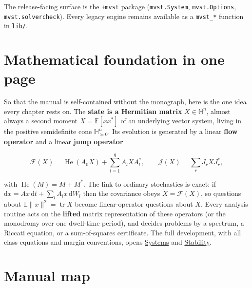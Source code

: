 \documentclass[11pt,oneside]{report}
\newcommand{\code}[1]{\texttt{#1}}
\begin{document}
The release-facing surface is the \code{+mvst} package (\code{mvst.System},
\code{mvst.Options}, \code{mvst.solvercheck}). Every legacy engine remains available as a
\code{mvst\_*} function in \code{lib/}.

\hypertarget{mathematical-foundation-in-one-page}{%
\section*{Mathematical foundation in one page}\label{mathematical-foundation-in-one-page}}

So that the manual is self-contained without the monograph, here is the one idea
every chapter rests on. The \textbf{state is a Hermitian matrix} \(X\in\mathbb{H}^{n}\),
almost always a second moment \(X=\mathbb{E}[x x^{*}]\) of an underlying vector
system, living in the positive semidefinite cone
\(\mathbb{H}^{n}_{\succeq0}\). Its evolution is generated by a linear \textbf{flow
operator} and a linear \textbf{jump operator}

\[\mathcal{F}(X)=\operatorname{He}(A_0X)+\sum_{l=1}^{q}A_l X A_l^{*},\qquad \mathcal{J}(X)=\sum_{r}J_r X J_r^{*},\]

with \(\operatorname{He}(M)=M+M^{*}\). The link to ordinary stochastics is exact:
if \(\mathrm{d}x=A x\,\mathrm{d}t+\sum_l A_l x\,\mathrm{d}W_l\) then the covariance
obeys \(\dot X=\mathcal{F}(X)\), so questions about \(\mathbb{E}\|x\|^{2} =\operatorname{tr}X\) become linear-operator questions about \(X\). Every analysis
routine acts on the \textbf{lifted} matrix representation of these operators (or the
monodromy over one dwell-time period), and decides problems by a spectrum, a Riccati
equation, or a sum-of-squares certificate. The full development, with all class
equations and margin conventions, opens \protect\hyperlink{chap:02-systems}{Systems} and
\protect\hyperlink{chap:03-stability}{Stability}.

\hypertarget{manual-map}{%
\section*{Manual map}\label{manual-map}}
\end{document}
